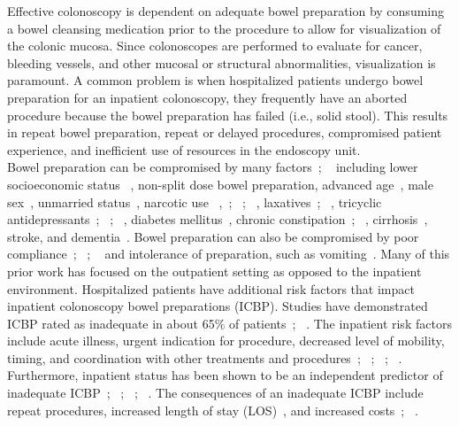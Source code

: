 \documentclass[Bprep]{subfiles}
\begin{document}
Effective colonoscopy is dependent on adequate bowel preparation by consuming a bowel cleansing medication prior to the procedure to allow for visualization of the colonic mucosa. Since colonoscopes are performed to evaluate for cancer, bleeding vessels, and other mucosal or structural abnormalities, visualization is paramount. A common problem is when hospitalized patients undergo bowel preparation for an inpatient colonoscopy, they frequently have an aborted procedure because the bowel preparation has failed (i.e., solid stool). This results in repeat bowel preparation, repeat or delayed procedures, compromised patient experience, and inefficient use of resources in the endoscopy unit.\\

Bowel preparation can be compromised by many factors~\cite{Johnson2014-nm}; ~\cite{Garber2019-rw} including lower socioeconomic status ~\cite{Yadlapati2015-ej}, non-split dose bowel preparation, advanced age~\cite{Chung2009-kt}, male sex~\cite{Yadlapati2015-ej}, unmarried status~\cite{Lebwohl2010-ti}, narcotic use ~\cite{Garber2019-rw},~\cite{Yadlapati2015-ej}; ~\cite{Govani2016-rb}; ~\cite{Reilly2004-tz}, laxatives~\cite{Yadlapati2015-ej}; ~\cite{Reilly2004-tz}, tricyclic antidepressants~\cite{Ness2001-ff}; ~\cite{Govani2016-rb}; ~\cite{Hautefeuille2014-yy}, diabetes mellitus~\cite{Reilly2004-tz}, chronic constipation~\cite{Reilly2004-tz}; ~\cite{Hautefeuille2014-yy}, cirrhosis~\cite{Ness2001-ff}, stroke, and dementia~\cite{Ness2001-ff}. Bowel preparation can also be compromised by poor compliance~\cite{Ness2001-ff}; ~\cite{Hautefeuille2014-yy}; ~\cite{Chorev2007-ka} and intolerance of preparation, such as vomiting~\cite{Hautefeuille2014-yy}. Many of this prior work has focused on the outpatient setting as opposed to the inpatient environment. Hospitalized patients have additional risk factors that impact inpatient colonoscopy bowel preparations (ICBP). Studies have demonstrated ICBP rated as inadequate in about 65\% of patients~\cite{Garber2019-rw}; ~\cite{Chambers2016-al}. The inpatient risk factors include acute illness, urgent indication for procedure, decreased level of mobility, timing, and coordination with other treatments and procedures~\cite{Garber2019-rw}; ~\cite{Ness2001-ff}; ~\cite{Lebwohl2010-ti}; ~\cite{Chorev2007-ka}. Furthermore, inpatient status has been shown to be an independent predictor of inadequate ICBP~\cite{Ness2001-ff}; ~\cite{Livovsky2017-ds}; ~\cite{Almadi2018-lx}; ~\cite{Mahmood2018-xt}. The consequences of an inadequate ICBP include repeat procedures, increased length of stay
(LOS)~\cite{Garber2019-rw}, and increased costs~\cite{Yadlapati2015-ej}; ~\cite{Livovsky2017-ds}.\\
\end{document}
